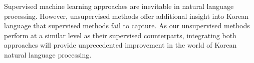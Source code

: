 \documentclass[oneside, ko,phd]{snuthesis_utf8_kor}
\begin{document}
\begin{abstractalt}
Supervised machine learning approaches are inevitable in natural language processing.
However, unsupervised methods offer additional insight into Korean language that supervised methods fail to capture.
As our unsupervised methods perform at a similar level as their supervised counterparts, integrating both approaches will provide unprecedented improvement in the world of Korean natural language processing.
\end{abstractalt}

\acknowledgement{}
\end{document}
